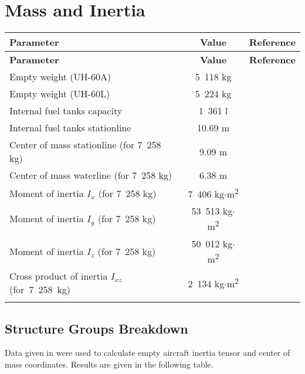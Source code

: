 \section{Mass and Inertia}

\begin{tabularx}{\textwidth}{ | L | c | c | }
  \hline
  \textbf{Parameter}                    & \textbf{Value}   & \textbf{Reference} \\ \hline
  \endfirsthead
  \hline
  \textbf{Parameter}                    & \textbf{Value}   & \textbf{Reference} \\ \hline
  \endhead
  Empty weight (UH-60A)                 & 5~118 kg         & \cite{Janes20042005} \\ \hline
  Empty weight (UH-60L)                 & 5~224 kg         & \cite{Janes20042005} \\ \hline
  Internal fuel tanks capacity          & 1~361 l          & \cite{Janes20042005,UH60_OperatorsManual} \\ \hline
  Internal fuel tanks stationline       & 10.69 m          & \cite{UH60_OperatorsManual} \\ \hline
  Center of mass stationline (for 7~258 kg) & 9.09 m        & \cite{NASA-CR-166309} \\ \hline
  Center of mass waterline (for 7~258 kg)   & 6.38 m        & \cite{NASA-CR-166309} \\ \hline
  Moment of inertia $I_x$ (for 7~258 kg) &  7~406 kg$\cdot$m\textsuperscript{2} & \cite{NASA-CR-166309} \\ \hline
  Moment of inertia $I_y$ (for 7~258 kg) & 53~513 kg$\cdot$m\textsuperscript{2} & \cite{NASA-CR-166309} \\ \hline
  Moment of inertia $I_z$ (for 7~258 kg) & 50~012 kg$\cdot$m\textsuperscript{2} & \cite{NASA-CR-166309} \\ \hline
  Cross product of inertia $I_{xz}$ (for~7~258~kg) & 2~134 kg$\cdot$m\textsuperscript{2} & \cite{NASA-CR-166309} \\ \hline
  \caption{Mass data}
\end{tabularx}

\clearpage
\subsection{Structure Groups Breakdown}

Data given in \cite{UH60_OperatorsManual,NASA-CR-166309,UH60_MaintenanceManual} were used to calculate empty aircraft inertia tensor and center of mass coordinates. Results are given in the following table.

